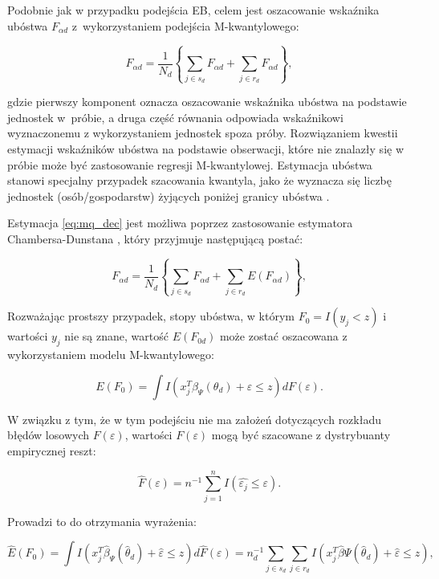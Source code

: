 Podobnie jak w przypadku podejścia EB, celem jest oszacowanie wskaźnika ubóstwa $F_{\alpha d}$ z~wykorzystaniem podejścia M-kwantylowego:

\begin{equation}
F_{\alpha d}=\frac{1}{N_d}\left\{\sum\limits_{j \in s_d}{F_{\alpha d}}+\sum\limits_{j \in r_d}{F_{\alpha d}}\right\},
\label{eq:mq_dec}
\end{equation}

gdzie pierwszy komponent oznacza oszacowanie wskaźnika ubóstwa na podstawie jednostek w~próbie, a druga część równania odpowiada wskaźnikowi wyznaczonemu z wykorzystaniem jednostek spoza próby. Rozwiązaniem kwestii estymacji wskaźników ubóstwa na podstawie obserwacji, które nie znalazły się w próbie może być zastosowanie regresji M-kwantylowej. Estymacja ubóstwa stanowi specjalny przypadek szacowania kwantyla, jako że wyznacza się liczbę jednostek (osób/gospodarstw) żyjących poniżej granicy ubóstwa \citep{tzavidis2008}. 

Estymacja \ref{eq:mq_dec} jest możliwa poprzez zastosowanie estymatora Chambersa-Dunstana \citep{lombardia2004}, który przyjmuje następującą postać:

\begin{equation}
F_{\alpha d}=\frac{1}{N_d}\left\{\sum\limits_{j \in s_d}{F_{\alpha d}}+\sum\limits_{j \in r_d}{E(F_{\alpha d})}\right\},
\label{eq:mq_dec2}
\end{equation}

Rozważając prostszy przypadek, stopy ubóstwa, w którym $F_{0}=I(y_j<z)$ i wartości $y_j$ nie są znane, wartość $E(F_{0 d})$ może zostać oszacowana z wykorzystaniem modelu M-kwantylowego:

\begin{equation}
E(F_{0})=\int I\left(x_j^T\beta_\Psi(\theta_d)+\varepsilon\leq z\right)dF(\varepsilon).
\label{eq:mq_calka}
\end{equation}

W związku z tym, że w tym podejściu nie ma założeń dotyczących rozkładu błędów losowych $F(\varepsilon)$, wartości $F(\varepsilon)$ mogą być szacowane z dystrybuanty empirycznej reszt:

\begin{equation}
\hat{F}(\varepsilon)=n^{-1}\sum\limits_{j=1}^{n}{I(\hat{\varepsilon_j}\leq\varepsilon)}.
\end{equation}

Prowadzi to do otrzymania wyrażenia:

\begin{equation}
\hat{E}(F_{0})=\int I\left(x_j^T\hat{\beta}_\Psi(\hat{\theta}_d)+\hat{\varepsilon}\leq z\right)d\hat{F}(\varepsilon)=n_d^{-1}\sum\limits_{j \in s_d}\sum\limits_{j \in r_d}I\left(x_j^T\hat{\beta}\Psi(\hat{\theta}_d)+\hat{\varepsilon}\leq z\right),
\end{equation}

